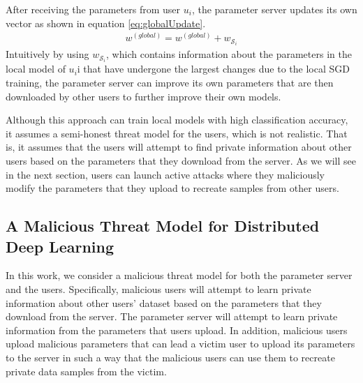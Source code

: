 \documentclass[letterpaper]{article}
\begin{document}
\begin{flushleft}
{%



After receiving the parameters from user $u_i$, the parameter server updates its own vector as shown in equation \eqref{eq:globalUpdate}.
\begin{align}\label{eq:globalUpdate}
w^{(global)} =  w^{(global)} +  w_{\mathcal{S}_i}
\end{align}
Intuitively by using $w_{\mathcal{S}_i}$, which contains information about the parameters in the local model of $u_i$i that have
undergone the largest changes due to the local SGD training, the parameter server can improve its own parameters that are then
downloaded by other users to further improve their own models.  


Although this approach can train local models with high classification accuracy,  it assumes a semi-honest threat model for the users,
which is not realistic. That is, it assumes that the users will attempt to find private information about other users based on 
the parameters that they download from the server. As we will see in the next section, users can launch active attacks where they
maliciously modify the parameters that they upload to recreate samples from other users. 


\subsection{A Malicious Threat Model for Distributed Deep Learning}\label{sec:threatModel}

In this work, we consider a malicious threat model for both the parameter server and the users. Specifically, malicious users will
attempt to learn private information about other users' dataset based on the parameters that they download from the server. The
parameter server will attempt to learn private information from the parameters that users upload.  In
addition, malicious users upload malicious parameters that can lead a victim user to upload its parameters to the server in such a way
that the malicious users can use them to recreate private data samples from the victim.

}
\end{flushleft}
\end{document}
